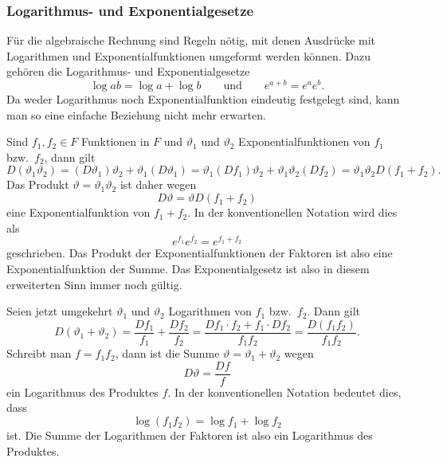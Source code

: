 %
%
\subsubsection{Logarithmus- und Exponentialgesetze}
Für die algebraische Rechnung sind Regeln nötig, mit denen Ausdrücke
mit Logarithmen und Exponentialfunktionen umgeformt werden können.
Dazu gehören die Logarithmus- und Exponentialgesetze
%
%
\[
\log ab = \log a + \log b
\qquad\text{und}\qquad
e^{a+b}=e^ae^b.
\]
Da weder Logarithmus noch Exponentialfunktion eindeutig festgelegt
sind, kann man so eine einfache Beziehung nicht mehr erwarten.

Sind $f_1,f_2\in F$ Funktionen in $F$ und $\vartheta_1$ und $\vartheta_2$
Exponentialfunktionen von $f_1$ bzw.~$f_2$, dann gilt
\[
D(\vartheta_1\vartheta_2)
=
(D\vartheta_1)\vartheta_2
+
\vartheta_1(D\vartheta_1)
=
\vartheta_1 (Df_1) \vartheta_2
+
\vartheta_1\vartheta_2 (Df_2)
=
\vartheta_1\vartheta_2 D(f_1+f_2).
\]
Das Produkt $\vartheta = \vartheta_1\vartheta_2$ ist daher wegen
\[
D\vartheta = \vartheta D(f_1+f_2)
\]
eine Exponentialfunktion von $f_1+f_2$.
In der konventionellen Notation wird dies als
\[
e^{f_1} e^{f_2}
=
e^{f_1+f_2}
\]
geschrieben.
Das Produkt der Exponentialfunktionen der Faktoren ist also eine
Exponentialfunktion der Summe.
Das Exponentialgesetz ist also in diesem erweiterten Sinn immer noch
gültig.

Seien jetzt umgekehrt $\vartheta_1$ und $\vartheta_2$ Logarithmen von
$f_1$ bzw.~$f_2$.
Dann gilt
\[
D(\vartheta_1+\vartheta_2)
=
\frac{Df_1}{f_1}
+
\frac{Df_2}{f_2}
=
\frac{Df_1\cdot f_2+f_1\cdot Df_2}{f_1f_2}
=
\frac{D(f_1f_2)}{f_1f_2}.
\]
Schreibt man $f=f_1f_2$, dann ist die Summe
$\vartheta=\vartheta_1+\vartheta_2$ wegen
\[
D\vartheta = \frac{Df}{f}
\]
ein Logarithmus des Produktes $f$.
In der konventionellen Notation bedeutet dies, dass
\[
\log (f_1f_2)
=
\log f_1 + \log f_2
\]
ist.
Die Summe der Logarithmen der Faktoren ist also ein Logarithmus
des Produktes.

